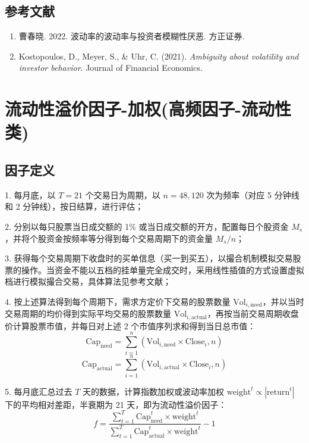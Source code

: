 \documentclass{article}
\begin{document}
\subsection{参考文献}
\begin{enumerate}
    \item 曹春晓. 2022. 波动率的波动率与投资者模糊性厌恶. 方正证券.
    \item Kostopoulos, D., Meyer, S., \& Uhr, C. (2021). \textit{Ambiguity about volatility and investor behavior}. Journal of Financial Economics.
\end{enumerate}

\section{流动性溢价因子-加权(高频因子-流动性类)}

\subsection{因子定义}

1. 每月底，以 \( T=21 \) 个交易日为周期，以 \( n=48,120 \) 次为频率（对应 5 分钟线和 2 分钟线），按日结算，进行评估；

2. 分别以每只股票当日成交额的 1\% 或当日成交额的开方，配置每日个股资金 \( M_s \)，并将个股资金按频率等分得到每个交易周期下的资金量 \( M_s/n \)；

3. 获得每个交易周期下收盘时的买单信息（买一到买五），以撮合机制模拟交易股票的操作。当资金不能以五档的挂单量完全成交时，采用线性插值的方式设置虚拟档进行模拟撮合交易，具体算法见参考文献；

4. 按上述算法得到每个周期下，需求方定价下交易的股票数量 \( \mathrm{Vol}_{i,\mathrm{need}} \)，并以当时交易周期的均价得到实际平均交易的股票数量 \( \mathrm{Vol}_{i,\mathrm{actual}} \)，再按当前交易周期收盘价计算股票市值，并每日对上述 2 个市值序列求和得到当日总市值：
\begin{equation}
    \mathrm{Cap}_{\mathrm{need}} = \sum_{i=1}^{n} (\mathrm{Vol}_{i,\mathrm{need}} \times \mathrm{Close}_i,n)
\end{equation}
\begin{equation}
    \mathrm{Cap}_{\mathrm{actual}} = \sum_{i=1}^{n} (\mathrm{Vol}_{i,\mathrm{actual}} \times \mathrm{Close}_i,n)
\end{equation}

5. 每月底汇总过去 \( T \) 天的数据，计算指数加权或波动率加权 \( \mathrm{weight}^t \propto |\mathrm{return}^t| \) 下的平均相对差距，半衰期为 21 天，即为流动性溢价因子：
\begin{equation}
    f = \frac{\sum_{t=1}^{T} \mathrm{Cap}_{\mathrm{need}}^t \times \mathrm{weight}^t}{\sum_{t=1}^{T} \mathrm{Cap}_{\mathrm{actual}}^t \times \mathrm{weight}^t} - 1
\end{equation}
\end{document}
